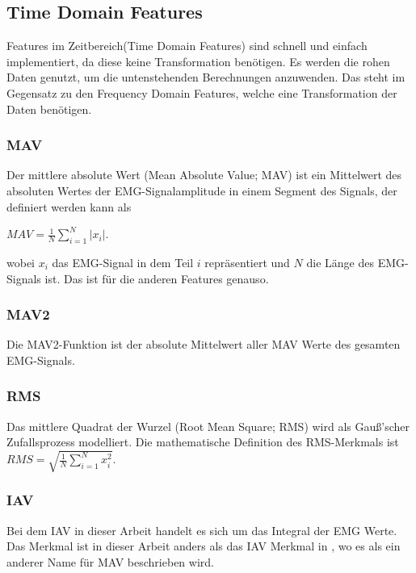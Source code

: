 \subsection{Time Domain Features}
 
Features im Zeitbereich(Time Domain Features) sind  schnell und einfach implementiert, da diese keine Transformation benötigen. Es werden die rohen Daten genutzt, um die untenstehenden Berechnungen anzuwenden. Das steht im Gegensatz zu den Frequency Domain Features, welche eine Transformation der Daten benötigen.

\subsubsection{MAV}

Der mittlere absolute Wert (Mean Absolute Value; MAV) ist
ein Mittelwert des absoluten Wertes der EMG-Signalamplitude in einem Segment des Signals, der definiert werden kann als 

 $MAV = \frac{1}{N} \sum_{i=1}^{N} \left | x_{i} \right | $. 

wobei  $x_{i} $ das EMG-Signal in dem Teil  $i $ repräsentiert  und  $N $ die Länge des EMG-Signals ist. Das ist für die anderen Features genauso.

	
\subsubsection{MAV2}

Die MAV2-Funktion ist der absolute Mittelwert aller MAV Werte des gesamten EMG-Signals.

\subsubsection{RMS}

Das mittlere Quadrat der Wurzel (Root Mean Square; RMS) wird als Gauß'scher Zufallsprozess modelliert. 
Die mathematische Definition des RMS-Merkmals ist 
$RMS = \sqrt{\frac{1}{N} \sum_{i=1}^{N}  x_{i}^{2} } $. 

\subsubsection{IAV}

Bei dem IAV in dieser Arbeit handelt es sich um das Integral der  EMG Werte. Das Merkmal ist in dieser Arbeit anders als das IAV Merkmal in  \cite{Phinyo2012-FT}, wo es als ein anderer Name für MAV beschrieben wird.   

